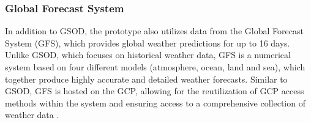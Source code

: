 \subsubsection{Global Forecast System}\label{GFS}
In addition to GSOD, the prototype also utilizes data from the Global Forecast System (GFS), which provides global weather predictions for up to 16 days. Unlike GSOD, which focuses on historical weather data, GFS is a numerical system based on four different models (atmosphere, ocean, land and sea), which together produce highly accurate and detailed weather forecasts. Similar to GSOD, GFS is hosted on the GCP, allowing for the reutilization of GCP access methods within the system and ensuring access to a comprehensive collection of weather data \autocite{NOAA_GSOD_2020}.